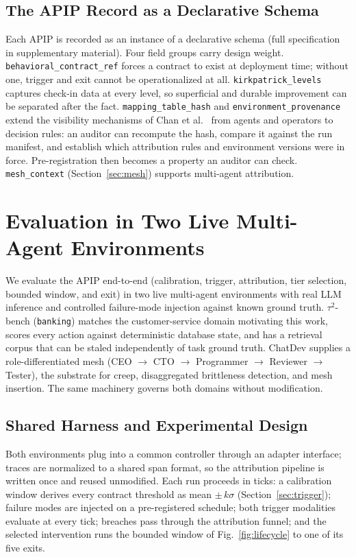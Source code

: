 \documentclass[conference]{IEEEtran}
\newcommand{\code}[1]{\texttt{\small #1}}
\begin{document}
\subsection{The APIP Record as a Declarative Schema}
\label{sec:schema}

Each APIP is recorded as an instance of a declarative schema (full
specification in supplementary material). Four field groups carry design
weight. \code{behavioral\_contract\_ref} forces a contract to exist at
deployment time; without one, trigger and exit cannot be operationalized at
all. \code{kirkpatrick\_levels} captures check-in data at every level, so
superficial and durable improvement can be separated after the fact.
\code{mapping\_table\_hash} and \code{environment\_provenance} extend the
visibility mechanisms of Chan et al.\ \cite{chan2024} from agents and operators
to decision rules: an auditor can recompute the hash, compare it against the
run manifest, and establish which attribution rules and environment versions
were in force. Pre-registration then becomes a property an auditor can check.
\code{mesh\_context} (Section~\ref{sec:mesh}) supports multi-agent attribution.

\section{Evaluation in Two Live Multi-Agent Environments}
\label{sec:evaluation}

We evaluate the APIP end-to-end (calibration, trigger, attribution, tier
selection, bounded window, and exit) in two live multi-agent environments with
real LLM inference and controlled failure-mode injection against known ground
truth. $\tau^2$-bench (\code{banking}) \cite{barres2025} matches the
customer-service domain motivating this work, scores every action against
deterministic database state, and has a retrieval corpus that can be staled
independently of task ground truth. ChatDev \cite{qian2024} supplies a
role-differentiated mesh (CEO $\rightarrow$ CTO $\rightarrow$ Programmer
$\rightarrow$ Reviewer $\rightarrow$ Tester), the substrate for creep,
disaggregated brittleness detection, and mesh insertion. The same machinery
governs both domains without modification.

\subsection{Shared Harness and Experimental Design}

Both environments plug into a common controller through an adapter interface;
traces are normalized to a shared span format, so the attribution pipeline is
written once and reused unmodified. Each run proceeds in ticks: a calibration
window derives every contract threshold as mean $\pm\,k\sigma$
(Section~\ref{sec:trigger}); failure modes are injected on a pre-registered
schedule; both trigger modalities evaluate at every tick; breaches pass through
the attribution funnel; and the selected intervention runs the bounded window
of Fig.~\ref{fig:lifecycle} to one of its five exits.
\end{document}

